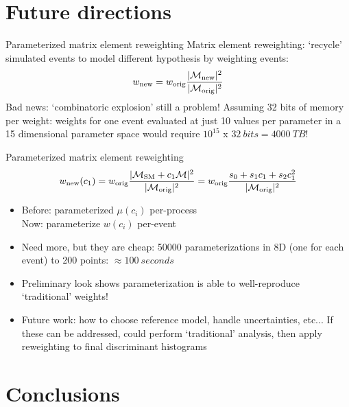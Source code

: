 \documentclass[professionalfont,fleqn]{beamer}
\DeclarePairedDelimiter{\abs}{\lvert}{\rvert}
\begin{document}
\section{Future directions}

\begin{frame}{Parameterized matrix element reweighting}
  Matrix element reweighting: `recycle' simulated events to model different hypothesis by weighting events:
  \begin{equation*}
    w_\text{new} = w_\text{orig} \frac{\abs{\mathcal{M}_\text{new}}^2}{\abs{\mathcal{M}_\text{orig}}^2}
  \end{equation*}
  Bad news: `combinatoric explosion' still a problem! Assuming 32 bits of memory per weight: weights for one event evaluated at just 10 values per parameter in a 15 dimensional parameter space would require $10^{15}$ x $\SI{32}{bits} = \SI{4000}{TB}$!
\end{frame}

\begin{frame}{Parameterized matrix element reweighting}
  \begin{equation*}
    w_\text{new}(c_1) = w_\text{orig} \frac{\abs{\mathcal{M}_\text{SM} + c_1\mathcal{M}}^2}{\abs{\mathcal{M}_\text{orig}}^2} = w_\text{orig} \frac{s_0 + s_1c_1 + s_2c_1^2}{\abs{\mathcal{M}_\text{orig}}^2}
  \end{equation*}
  \begin{itemize}
    \item Before: parameterized $\mu(c_i)$ per-process\\Now: parameterize $w(c_i)$ per-event
    \item Need more, but they are cheap: \num{50000} parameterizations in 8D (one for each event) to 200 points: $\approx \SI{100}{seconds}$
    \item Preliminary look shows parameterization is able to well-reproduce `traditional' weights!
    \item Future work: how to choose reference model, handle uncertainties, etc... If these can be addressed, could perform `traditional' analysis, then apply reweighting to final discriminant histograms
  \end{itemize}
\end{frame}

\section{Conclusions}
\end{document}
